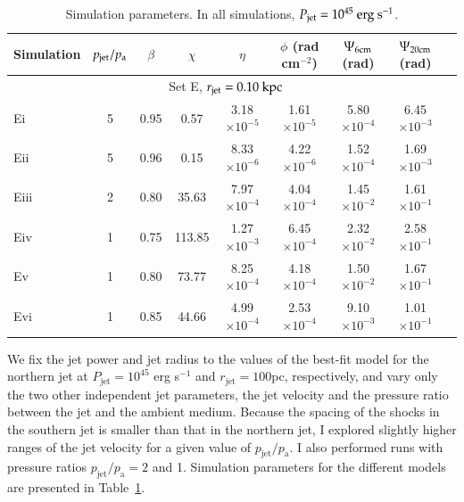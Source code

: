 \begin{table}
\caption{Simulation parameters. In all simulations, $P_{\rm{jet}}=10^{45} \rm \ erg \ s^{-1}$.}
\centering
\begin{tabular}{l * {8}{c}}
\hline \hline
Simulation  & $p_{\rm{jet}}/p_{\rm{a}}$ & $\beta$ & $\chi$ & $\eta$ & $\phi$ (rad cm$^{-2}$) & $\Psi_{6\rm{cm}}$ (rad) & $\Psi_{20\rm{cm}}$ (rad) \\
\hline
	\multicolumn{8}{c}{Set E, $r_{\rm{jet}}=0.10 \rm \ kpc$} \\ 
	\hline
  	Ei      & 5    & 0.95 & 0.57    & 3.18$\times10^{-5}$   & 1.61$\times10^{-5}$   & 5.80$\times10^{-4}$   & 6.45$\times10^{-3}$   \\
	Eii     & 5    & 0.96 & 0.15    & 8.33$\times10^{-6}$   & 4.22$\times10^{-6}$   & 1.52$\times10^{-4}$   & 1.69$\times10^{-3}$   \\
	Eiii	& 2   & 0.80 & 35.63    & 7.97$\times10^{-4}$   & 4.04$\times10^{-4}$   & 1.45$\times10^{-2}$   & 1.61$\times10^{-1}$ \\
	Eiv	& 1  & 0.75   & 113.85 & 1.27$\times10^{-3}$   & 6.45$\times10^{-4}$ & 2.32$\times10^{-2}$ & 2.58$\times10^{-1}$ \\
	Ev    & 1  &  0.80  & 73.77   &  8.25$\times10^{-4}$   & 4.18$\times10^{-4}$   & 1.50$\times10^{-2}$   & 1.67$\times10^{-1}$   \\
	Evi      & 1    & 0.85 &  44.66  & 4.99$\times10^{-4}$   & 2.53$\times10^{-4}$   & 9.10$\times10^{-3}$   & 1.01$\times10^{-1}$   \\
		\hline
\end{tabular}
\label{t:sim_par_s}
\end{table}

We fix the jet power and jet radius to the values of the best-fit model for the northern jet at $P_\mathrm{jet} = 10^{45}$ erg s$^{-1}$ and $r_\mathrm{jet}=100$pc, respectively, and vary only the two other independent jet parameters, the jet velocity and the pressure ratio between the jet and the ambient medium. Because the spacing of the shocks in the southern jet is smaller than that in the northern jet, I explored slightly higher ranges of the jet velocity for a given value of $p_\mathrm{jet}/p_\mathrm{a}$. I  also performed runs with pressure ratios $p_\mathrm{jet}/p_\mathrm{a}=2$ and 1. Simulation parameters for the different models are presented in Table~\ref{t:sim_par_s}.


